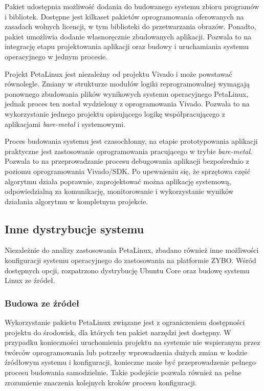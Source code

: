 Pakiet udostępnia możliwość dodania do budowanego systemu zbioru programów i bibliotek. 
Dostępne jest kilkaset pakietów oprogramowania oferowanych na zasadach wolnych licencji, w tym biblioteki do przetwarzania obrazów. 
Ponadto, pakiet umożliwia dodanie własnoręcznie zbudowanych aplikacji. 
Pozwala to na integrację etapu projektowania aplikacji oraz budowy i uruchamiania systemu operacyjnego w jednym procesie.

Projekt PetaLinux jest niezależny od projektu Vivado i może powstawać równolegle. 
Zmiany w strukturze modułów logiki reprogramowalnej wymagają ponownego zbudowania plików wynikowych systemu operacyjnego PetaLinux, jednak proces ten został wydzielony z oprogramowania Vivado.
Pozwala to na wykorzystanie jednego projektu opisującego logikę współpracującego z aplikacjami \textit{bare-metal} i systemowymi. 

Proces budowania systemu jest czasochłonny, na etapie prototypowania aplikacji praktyczne jest zastosowanie oprogramowania pracującego w trybie \textit{bare-metal}. 
Pozwala to na przeprowadzanie procesu debugowania aplikacji bezpośrednio z poziomu oprogramowania Vivado/SDK. 
Po upewnieniu się, że sprzętowa część algorytmu działa poprawnie, zaprojektować można aplikację systemową, odpowiedzialną za komunikację, monitorowanie i wykorzystanie wyników działania algorytmu w kompletnym projekcie.

\subsection{Inne dystrybucje systemu}
Niezależnie do analizy zastosowania PetaLinux, zbadano również inne możliwości konfiguracji systemu operacyjnego do zastosowania na platformie ZYBO. 
Wśród dostępnych opcji, rozpatrzono dystrybucję Ubuntu Core oraz budowę systemu Linux ze źródeł.


\subsubsection{Budowa ze źródeł}
Wykorzystanie pakietu PetaLinux związane jest z ograniczeniem dostępności projektu do środowisk, dla których ten pakiet narzędzi jest dostępny. 
W przypadku konieczności uruchomienia projektu na systemie nie wspieranym przez twórców oprogramowania lub potrzeby wprowadzenia dużych zmian w kodzie źródłowym systemu i konfiguracji, konieczne może być przeprowadzenie pełnego procesu budowania samodzielnie. 
Takie podejście pozwala również na pełne zrozumienie znaczenia kolejnych kroków procesu konfiguracji.


